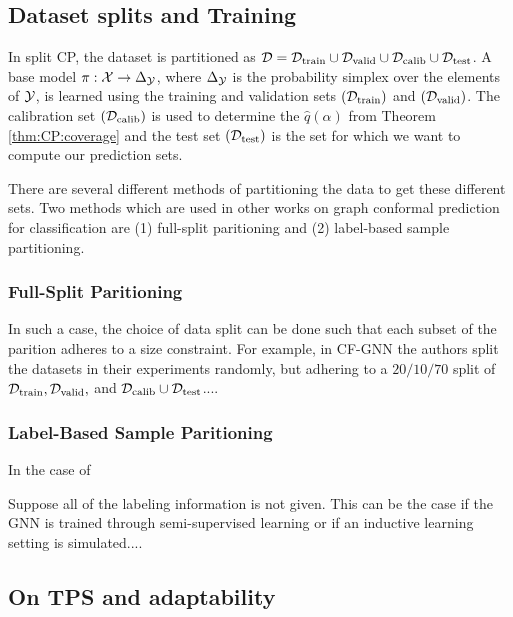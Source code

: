 \subsection{Dataset splits and Training}
In split CP, the dataset is partitioned as $\mathcal{D} = {\mathcal{D}}_{\text{train}}\cup {\mathcal{D}}_{\text{valid}}\cup {\mathcal{D}}_{\text{calib}}\cup  {\mathcal{D}}_{\text{test}}$. A base model $\pi: {\mathcal{X}} \to \Delta_{{\mathcal{Y}}}$, where $\Delta_{{\mathcal{Y}}}$ is the probability simplex over the elements of ${\mathcal{Y}}$, is learned using the training and validation sets $({\mathcal{D}}_{\text{train}})$ and $({\mathcal{D}}_{\text{valid}})$. The calibration set $({\mathcal{D}}_{\text{calib}})$ is used to determine the $\hat{q}(\alpha)$ from Theorem \ref{thm:CP:coverage} and the test set $({\mathcal{D}}_{\text{test}})$ is the set for which we want to compute our prediction sets.

There are several different methods of partitioning the data to get these different sets. Two methods which are used in other works on graph conformal prediction for classification are (1) full-split paritioning and (2) label-based sample partitioning. %
 
\subsubsection{Full-Split Paritioning}

In such a case, the choice of data split can be done such that each subset of the parition adheres to a size constraint. For example, in CF-GNN \cite{huang2024uncertainty} the authors split the datasets in their experiments randomly, but adhering to a $20/10/70$ split of ${\mathcal{D}}_{\text{train}}, {\mathcal{D}}_{\text{valid}},$ and ${\mathcal{D}}_{\text{calib}}\cup {\mathcal{D}}_{\text{test}}$....

\subsubsection{Label-Based Sample Paritioning}
In the case of 

Suppose all of the labeling information is not given. This can be the case if the GNN is trained through semi-supervised learning or if an inductive learning setting is simulated....

\subsection{On TPS and adaptability}

